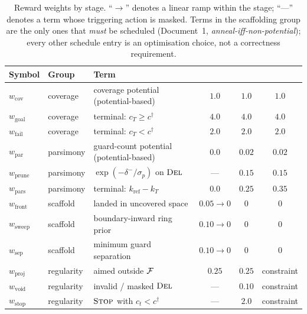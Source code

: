 \documentclass[11pt,a4paper]{article}
\begin{document}
\begin{table}[t]
\centering
\small
\caption{Reward weights by stage. ``$\to$'' denotes a linear ramp within the stage;
``---'' denotes a term whose triggering action is masked. Terms in the scaffolding group
are the only ones that \emph{must} be scheduled (Document~1, \emph{anneal-iff-non-potential}); every
other schedule entry is an optimisation choice, not a correctness requirement.}
\label{tab:schedule}
\renewcommand{\arraystretch}{1.22}
\begin{tabularx}{\linewidth}{@{}l l X c c c@{}}
\toprule
\textbf{Symbol} & \textbf{Group} & \textbf{Term} & \textbf{\stageI{}} & \textbf{\stageII{}} & \textbf{\stageIII{}} \\
\midrule
$w_{\mathrm{cov}}$   & coverage  & coverage potential (potential-based)        & $1.0$ & $1.0$ & $1.0$ \\
$w_{\mathrm{goal}}$  & coverage  & terminal: $c_T \ge c^{\dagger}$             & $4.0$ & $4.0$ & $4.0$ \\
$w_{\mathrm{fail}}$  & coverage  & terminal: $c_T < c^{\dagger}$               & $2.0$ & $2.0$ & $2.0$ \\
\addlinespace
$w_{\mathrm{par}}$   & parsimony & guard-count potential (potential-based)     & $\mathbf{0.0}$ & $\mathbf{0.02}$ & $0.02$ \\
$w_{\mathrm{prune}}$ & parsimony & $\exp(-\delta^{-}/\sigma_p)$ on $\textsc{Del}$      & ---   & $0.15$ & $0.15$ \\
$w_{\mathrm{pars}}$  & parsimony & terminal: $k_{\mathrm{ref}} - k_T$          & $0.0$ & $0.25$ & $0.35$ \\
\addlinespace
$w_{\mathrm{front}}$ & scaffold  & landed in uncovered space                   & $0.05 \to 0$ & $0$ & $0$ \\
$w_{\mathrm{sweep}}$ & scaffold  & boundary-inward ring prior                  & $0.10 \to 0$ & $0$ & $0$ \\
$w_{\mathrm{sep}}$   & scaffold  & minimum guard separation                    & $0.10 \to 0$ & $0$ & $0$ \\
\addlinespace
$w_{\mathrm{proj}}$  & regularity& aimed outside $\mathcal{F}$                       & $0.25$ & $0.25$ & constraint \\
$w_{\mathrm{void}}$  & regularity& invalid / masked $\textsc{Del}$                     & ---    & $0.10$ & constraint \\
$w_{\mathrm{stop}}$  & regularity& $\textsc{Stop}$ with $c_t < c^{\dagger}$            & ---    & $2.0$  & constraint \\
\midrule

\end{tabularx}
\end{table}
\end{document}

